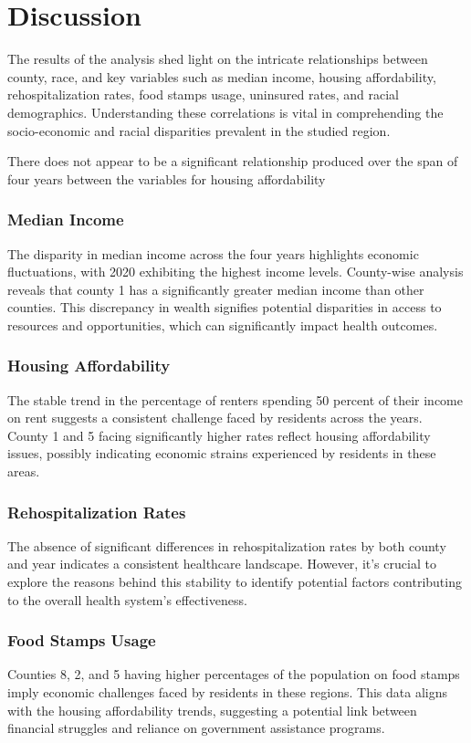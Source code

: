 \documentclass[12pt]{article}
\begin{document}
\section{Discussion}\label{sec:disc}

The results of the analysis shed light on the intricate relationships between county, race, and key 
variables such as median income, housing affordability, rehospitalization rates, food stamps usage, 
uninsured rates, and racial demographics. Understanding these correlations is vital in comprehending 
the socio-economic and racial disparities prevalent in the studied region.

There does not appear to be a significant relationship produced over the span of four years between the variables for housing affordability

\subsubsection{Median Income}
The disparity in median income across the four years highlights economic fluctuations, with 
2020 exhibiting the highest income levels. County-wise analysis reveals that county 1 has a significantly 
greater median income than other counties. This discrepancy in wealth signifies potential disparities in 
access to resources and opportunities, which can significantly impact health outcomes.

\subsubsection{Housing Affordability}
The stable trend in the percentage of renters spending 50 percent of their income on rent suggests a 
consistent challenge faced by residents across the years. County 1 and 5 facing significantly higher 
rates reflect housing affordability issues, possibly indicating economic strains experienced by residents in these areas.

\subsubsection{Rehospitalization Rates}
The absence of significant differences in rehospitalization rates by both county and year indicates 
a consistent healthcare landscape. However, it's crucial to explore the reasons behind this stability to identify 
potential factors contributing to the overall health system's effectiveness.

\subsubsection{Food Stamps Usage}
Counties 8, 2, and 5 having higher percentages of the population on food stamps imply economic challenges 
faced by residents in these regions. This data aligns with the housing affordability trends, suggesting a potential 
link between financial struggles and reliance on government assistance programs.
\end{document}
